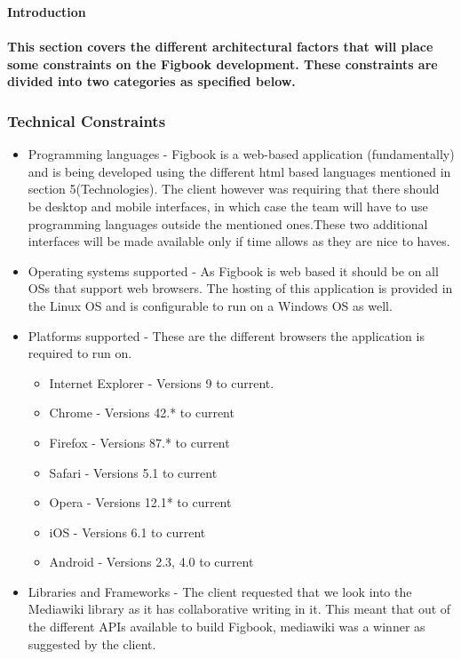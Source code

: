 \textbf{Introduction}\paragraph{This section covers the different architectural factors that will place some constraints on the Figbook development. These constraints are divided into two categories as specified below. } 

\subsubsection{Technical Constraints}
\begin{itemize}
\item Programming languages - Figbook is a web-based application (fundamentally) and is being developed using the different html based languages mentioned in section 5(Technologies). The client however was requiring that there should be desktop and mobile interfaces, in which case the team will have to use programming languages outside the mentioned ones.These two additional interfaces will be made available only if time allows as they are nice to haves.

\item Operating systems supported - As Figbook is web based it should be on all OSs that support web browsers. The hosting of this application is provided in the Linux OS and is configurable to run on a Windows OS as well. 
\item Platforms supported -  These are the different browsers the application is required to run on.
\begin{itemize}
\item Internet Explorer -  Versions 9 to current.
\item Chrome -  Versions 42.* to current
\item Firefox -  Versions 87.* to current
\item Safari -  Versions 5.1 to current
\item Opera -  Versions 12.1* to current
\item iOS -  Versions 6.1 to current
\item Android -  Versions 2.3, 4.0 to current
\end{itemize}
\item Libraries and Frameworks - The client requested that we look into the Mediawiki library as it has collaborative writing in it. This meant that out of the different APIs available to build Figbook, mediawiki was a winner as suggested by the client.
\end{itemize}
